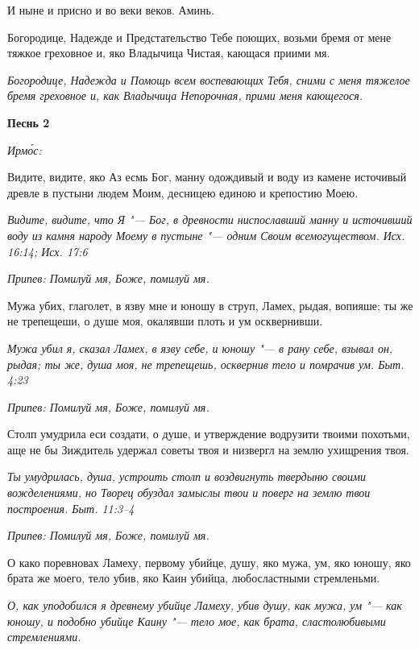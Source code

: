 И ныне и присно и во веки веков. Аминь.


Богородице, Надежде и Предстательство Тебе поющих, возьми бремя от мене тяжкое греховное и, яко Владычица Чистая, кающася приими мя.


\itshape Богородице, Надежда и Помощь всем воспевающих Тебя, сними с меня тяжелое бремя греховное и, как Владычица Непорочная, прими меня кающегося.\normalfont{}





\bfseries Песнь 2\normalfont{}


\itshape Ирмо́с:\normalfont{}


Видите, видите, яко Аз есмь Бог, манну одождивый и воду из камене источивый древле в пустыни людем Моим, десницею единою и крепостию Моею.


\itshape Видите, видите, что Я "--- Бог, в древности ниспославший манну и источивший воду из камня народу Моему в пустыне "--- одним Своим всемогуществом. Исх. 16:14; Исх. 17:6\normalfont{}


\itshape Припев:\normalfont{} Помилуй мя, Боже, помилуй мя.


Мужа убих, глаголет, в язву мне и юношу в струп, Ламех, рыдая, вопияше; ты же не трепещеши, о душе моя, окалявши плоть и ум осквернивши.


\itshape Мужа убил я, сказал Ламех, в язву себе, и юношу "--- в рану себе, взывал он, рыдая; ты же, душа моя, не трепещешь, осквернив тело и помрачив ум. Быт. 4:23\normalfont{}


\itshape Припев:\normalfont{} Помилуй мя, Боже, помилуй мя.


Столп умудрила еси создати, о душе, и утверждение водрузити твоими похотьми, аще не бы Зиждитель удержал советы твоя и низвергл на землю ухищрения твоя.


\itshape Ты умудрилась, душа, устроить столп и воздвигнуть твердыню своими вожделениями, но Творец обуздал замыслы твои и поверг на землю твои построения. Быт. 11:3–4\normalfont{}


\itshape Припев:\normalfont{} Помилуй мя, Боже, помилуй мя.


О како поревновах Ламеху, первому убийце, душу, яко мужа, ум, яко юношу, яко брата же моего, тело убив, яко Каин убийца, любосластными стремленьми.


\itshape О, как уподобился я древнему убийце Ламеху, убив душу, как мужа, ум "--- как юношу, и подобно убийце Каину "--- тело мое, как брата, сластолюбивыми стремлениями.\normalfont{}


